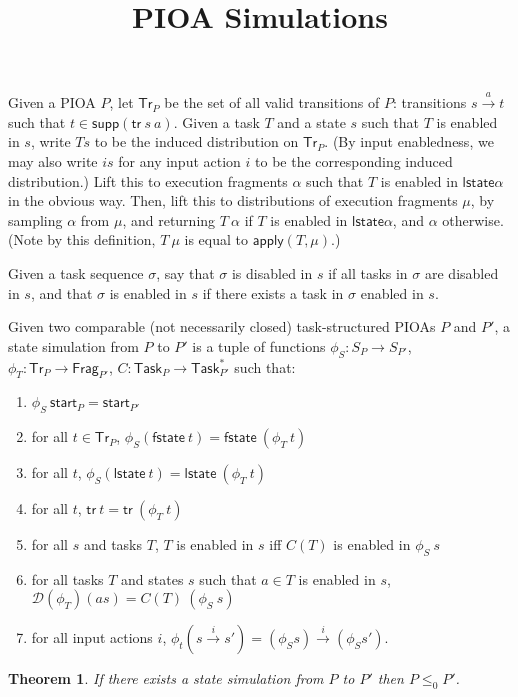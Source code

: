 \documentclass{article}
\newcommand{\tr}{\mathsf{tr}}
\newcommand{\start}{\mathsf{start}}
\newcommand{\supp}{\mathsf{supp}}
\newcommand{\Frag}{\mathsf{Frag}}
\newcommand{\Tr}{\mathsf{Tr}}
\newcommand{\Task}{\mathsf{Task}}
\newcommand{\lst}{\mathsf{lstate}}
\newcommand{\fst}{\mathsf{fstate}}
\newcommand{\D}{\mathcal{D}}
\newtheorem{theorem}{Theorem}
\begin{document}
\title{PIOA Simulations}

\maketitle

Given a PIOA $P$, let $\Tr_P$ be the set of all valid transitions of $P$: transitions $s \xrightarrow{a} t$ such that $t \in \supp(\tr\ s\ a)$. Given a task $T$ and a state $s$ such that $T$ is enabled in $s$, write $Ts$ to be the induced distribution on $\Tr_P$. (By input enabledness, we
may also write $is$ for any input action $i$ to be the corresponding induced distribution.) Lift this to execution fragments $\alpha$ such that $T$ is enabled in $\lst \alpha$ in the obvious way. Then, lift this to distributions of execution fragments $\mu$, by sampling $\alpha$ from $\mu$, and returning $T\ \alpha$ if $T$ is enabled in $\lst \alpha$, and $\alpha$ otherwise. (Note by this definition, $T\ \mu$ is equal to $\textsf{apply}(T, \mu)$.)

Given a task sequence $\sigma$, say that $\sigma$ is disabled in $s$ if all tasks in $\sigma$ are disabled in $s$, and that $\sigma$ is enabled in $s$ if there exists a task in $\sigma$ enabled in $s$.

Given two comparable (not necessarily closed) task-structured PIOAs $P$ and $P'$, a state simulation from $P$ to $P'$ is a tuple of functions $\phi_S : S_P \to S_{P'}$, $\phi_T : \Tr_P \to \Frag_{P'}$, $C : \Task_P \to \Task_{P'}^*$ such that:
\begin{enumerate}
    \item $\phi_S\ \start_P = \start_{P'}$
    \item for all $t \in \Tr_P$, $\phi_S (\fst\ t) = \fst\ (\phi_T\ t)$
    \item for all $t$, $\phi_S (\lst\ t) = \lst\ (\phi_T\ t)$
    \item for all $t$, $\tr\ t = \tr\ (\phi_T\ t)$
    \item for all $s$ and tasks $T$, $T$ is enabled in $s$ iff $C(T)$ is enabled in $\phi_S\ s$
    \item for all tasks $T$ and states $s$ such that $a \in T$ is enabled in $s$, $\D(\phi_T) (as) = C(T)\ (\phi_S\ s)$
    \item for all input actions $i$, $\phi_t (s \xrightarrow{i} s') = (\phi_S s) \xrightarrow{i} (\phi_S s')$.
\end{enumerate}

\begin{theorem}
    If there exists a state simulation from $P$ to $P'$ then $P \leq_0 P'$.
\end{theorem}
\end{document}
